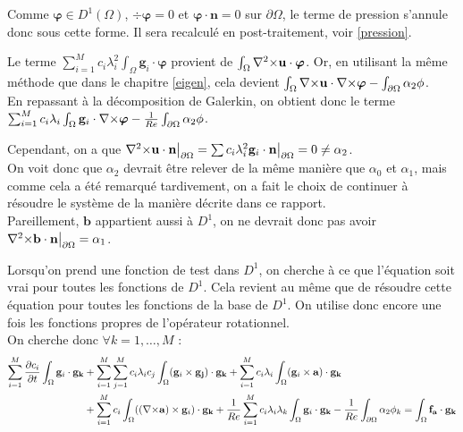 \begin{rk}
Comme $\bm{\varphi}\in D^1(\Omega)$, $\div\bm{\varphi}=0$ et $\bm{\varphi}\cdot \mathbf{n}=0$ sur $\partial\Omega$, le terme de pression s'annule donc sous cette forme. Il sera recalculé en post-traitement, voir \ref{pression}.\\
\end{rk}
Le terme $\sum_{i=1}^Mc_i\lambda_i^2\int_\Omega\mathbf{g}_i\cdot\bm{\varphi}$ provient de $\int_\Omega {\nabla^2\times}\mathbf{u}\cdot\bm{\varphi}$. Or, en utilisant la même méthode que dans le chapitre \ref{eigen}, cela devient $\int_\Omega{\nabla\times}\mathbf{u}\cdot{\nabla\times}\bm{\varphi} -\int_{\partial\Omega} \alpha_2\phi$.\\
En repassant à la décomposition de Galerkin, on obtient donc le terme $\sum_{i=1}^Mc_i\lambda_i\int_\Omega\mathbf{g}_i\cdot{\nabla\times}\bm{\varphi}-\frac{1}{Re}\int_{\partial\Omega} \alpha_2\phi$.\\
\begin{rk}
Cependant, on a que ${\nabla^2\times}\mathbf{u}\cdot\mathbf{n}{\big\rvert_{\partial\Omega}}=\sum c_i\lambda_i^2 \mathbf{g}_i\cdot\mathbf{n}{\big\rvert_{\partial\Omega}} = 0 \neq\alpha_2$.\\
On voit donc que $\alpha_2$ devrait être relever de la même manière que $\alpha_0$ et $\alpha_1$, mais comme cela a été remarqué tardivement, on a fait le choix de continuer à résoudre le système de la manière décrite dans ce rapport.\\
Pareillement, $\mathbf{b}$ appartient aussi à $D^1$, on ne devrait donc pas avoir ${\nabla^2\times}\mathbf{b}\cdot\mathbf{n}{\big\rvert_{\partial\Omega}}=\alpha_1$.
\end{rk}
Lorsqu'on prend une fonction de test dans $D^1$, on cherche à ce que l'équation soit vrai pour toutes les fonctions de $D^1$. Cela revient au même que de résoudre cette équation pour toutes les fonctions de la base de $D^1$. On utilise donc encore une fois les fonctions propres de l'opérateur rotationnel.\\
On cherche donc $\forall k=1,\dots,M$ :
\begin{align*}
\sum_{i=1}^M\frac{\partial c_i}{\partial t}\int_\Omega\mathbf{g}_i\cdot\mathbf{g_k} &+ \sum_{i=1}^M\sum_{j=1}^Mc_i\lambda_ic_j\int_\Omega(\mathbf{g}_i\times \mathbf{g_j})\cdot\mathbf{g_k} + \sum_{i=1}^Mc_i\lambda_i\int_\Omega(\mathbf{g}_i\times \mathbf{a})\cdot\mathbf{g_k}\\
& +  \sum_{i=1}^Mc_i\int_\Omega(({\nabla\times}\mathbf{a})\times \mathbf{g}_i)\cdot\mathbf{g_k} +\frac{1}{Re}\sum_{i=1}^Mc_i\lambda_i\lambda_k\int_\Omega\mathbf{g}_i\cdot\mathbf{g_k}-\frac{1}{Re}\int_{\partial\Omega} \alpha_2\phi_k = \int_\Omega\mathbf{f_a}\cdot\mathbf{g_k}\\
\end{align*}
